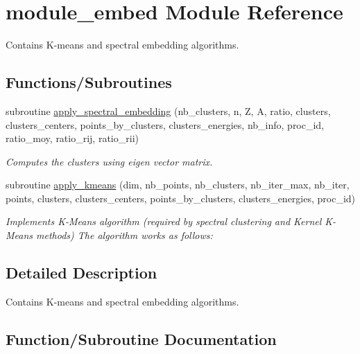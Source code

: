 \hypertarget{namespacemodule__embed}{}\section{module\+\_\+embed Module Reference}
\label{namespacemodule__embed}


Contains K-\/means and spectral embedding algorithms.  


\subsection*{Functions/\+Subroutines}
\begin{DoxyCompactItemize}
\item 
subroutine \hyperlink{namespacemodule__embed_ab78350f96b04d0ce2ca0bd10abd50440}{apply\+\_\+spectral\+\_\+embedding} (nb\+\_\+clusters, n, Z, A, ratio, clusters, clusters\+\_\+centers, points\+\_\+by\+\_\+clusters, clusters\+\_\+energies, nb\+\_\+info, proc\+\_\+id, ratio\+\_\+moy, ratio\+\_\+rij, ratio\+\_\+rii)
\begin{DoxyCompactList}\small\item\em Computes the clusters using eigen vector matrix. \end{DoxyCompactList}\item 
subroutine \hyperlink{namespacemodule__embed_a27f0555abee781e67c2def5e2b9471d2}{apply\+\_\+kmeans} (dim, nb\+\_\+points, nb\+\_\+clusters, nb\+\_\+iter\+\_\+max, nb\+\_\+iter, points, clusters, clusters\+\_\+centers, points\+\_\+by\+\_\+clusters, clusters\+\_\+energies, proc\+\_\+id)
\begin{DoxyCompactList}\small\item\em Implements K-\/\+Means algorithm (required by spectral clustering and Kernel K-\/\+Means methods) The algorithm works as follows\+: \end{DoxyCompactList}\end{DoxyCompactItemize}


\subsection{Detailed Description}
Contains K-\/means and spectral embedding algorithms. 

\subsection{Function/\+Subroutine Documentation}
\hypertarget{namespacemodule__embed_a27f0555abee781e67c2def5e2b9471d2}{}
